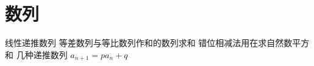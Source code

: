 
\chapter{数列}
\label{chap:number-sequence}
线性递推数列
等差数列与等比数列作和的数列求和
错位相减法用在求自然数平方和
几种递推数列
$a_{n+1}=pa_n+q$

